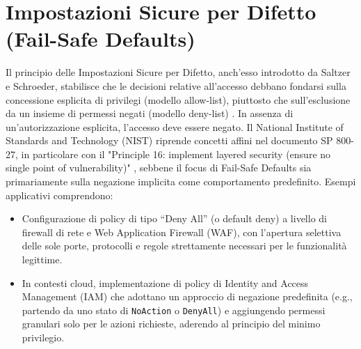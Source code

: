 \section{Impostazioni Sicure per Difetto (Fail-Safe Defaults)}
Il principio delle Impostazioni Sicure per Difetto, anch'esso introdotto da Saltzer e Schroeder, stabilisce che le decisioni relative all'accesso debbano fondarsi sulla concessione esplicita di privilegi (modello allow-list), piuttosto che sull'esclusione da un insieme di permessi negati (modello deny-list) \cite{Saltzer_Schroeder_1975}. In assenza di un'autorizzazione esplicita, l'accesso deve essere negato. Il National Institute of Standards and Technology (NIST) riprende concetti affini nel documento SP 800-27, in particolare con il "Principle 16: implement layered security (ensure no single point of vulnerability)" \cite{NIST_SP_800_27rA}, sebbene il focus di Fail-Safe Defaults sia primariamente sulla negazione implicita come comportamento predefinito.
Esempi applicativi comprendono:
\begin{itemize}
\item Configurazione di policy di tipo “Deny All” (o default deny) a livello di firewall di rete e Web Application Firewall (WAF), con l'apertura selettiva delle sole porte, protocolli e regole strettamente necessari per le funzionalità legittime.
\item In contesti cloud, implementazione di policy di Identity and Access Management (IAM) che adottano un approccio di negazione predefinita (e.g., partendo da uno stato di \texttt{NoAction} o \texttt{DenyAll}) e aggiungendo permessi granulari solo per le azioni richieste, aderendo al principio del minimo privilegio.
\end{itemize}
